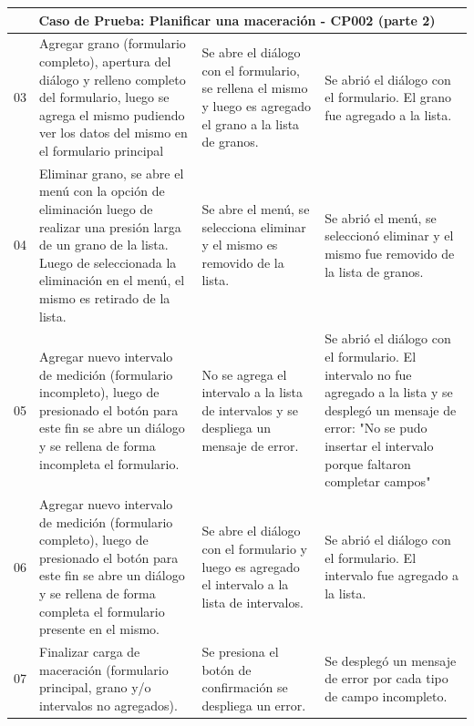         
        \begin{minipage}{0.95\textwidth}
        \begin{center}
        \begin{tabularx}{\textwidth}{ | p{2cm} | X | X | X |}
        \hline
        \multicolumn{4}{|c|}{\textbf{Caso de Prueba: Planificar una maceración - CP002 (parte 2)}} \\
        \hline
        03 & Agregar grano (formulario completo), apertura del diálogo y relleno completo del formulario, luego se agrega el mismo pudiendo ver los datos del mismo en el formulario principal & Se abre el diálogo con el formulario, se rellena el mismo y luego es agregado el grano a la lista de granos. & Se abrió el diálogo con el formulario. El grano fue agregado a la lista. \\
        \hline
        04 & Eliminar grano, se abre el menú con la opción de eliminación luego de realizar una presión larga de un grano de la lista. Luego de seleccionada la eliminación en el menú, el mismo es retirado de la lista. & Se abre el menú, se selecciona eliminar y el mismo es removido de la lista. & Se abrió el menú, se seleccionó eliminar y el mismo fue removido de la lista de granos. \\
        \hline
        05 & Agregar nuevo intervalo de medición (formulario incompleto), luego de presionado el botón para este fin se abre un diálogo y se rellena de forma incompleta el formulario.  & No se agrega el intervalo a la lista de intervalos y se despliega un mensaje de error. & Se abrió el diálogo con el formulario. El intervalo no fue agregado a la lista y se desplegó un mensaje de error: "No se pudo insertar el intervalo porque faltaron completar campos" \\
        \hline
        06 & Agregar nuevo intervalo de medición (formulario completo), luego de presionado el botón para este fin se abre un diálogo y se rellena de forma completa el formulario presente en el mismo. & Se abre el diálogo con el formulario y luego es agregado el intervalo a la lista de intervalos. & Se abrió el diálogo con el formulario. El intervalo fue agregado a la lista.\\
        \hline
        07 & Finalizar carga de maceración (formulario principal, grano y/o intervalos no agregados). & Se presiona el botón de confirmación se despliega un error. & Se desplegó un mensaje de error por cada tipo de campo incompleto.\\
        \hline
        \end{tabularx}
        \label{CP002-p2}
        \end{center}
        \end{minipage}
        
